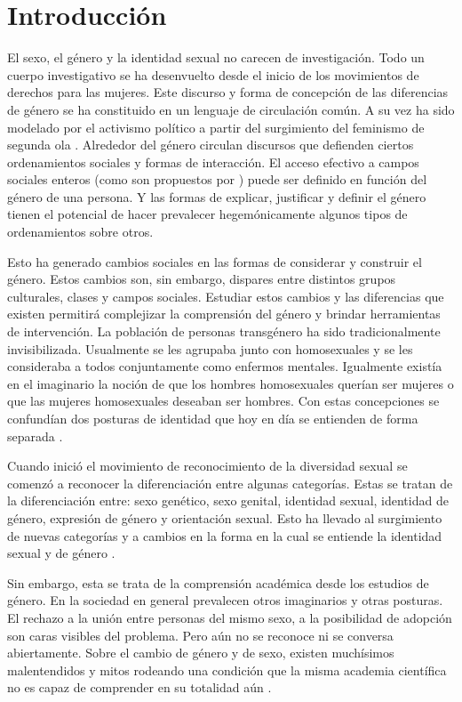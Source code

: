 \chapter{Introducción}
El sexo, el género y la identidad sexual no carecen de investigación.
Todo un cuerpo investigativo se ha desenvuelto desde el inicio de los
movimientos de derechos para las mujeres.
Este discurso y forma de concepción de las diferencias de género se ha
constituido en un lenguaje de circulación común.
A su vez ha sido modelado por el activismo político a partir del surgimiento del
feminismo de segunda ola \parencite{Helfrich2001}.
Alrededor del género circulan discursos que defienden ciertos ordenamientos
sociales y formas de interacción.
El acceso efectivo a campos sociales enteros (como son propuestos por
\textcite{Bourdieu1992}) puede ser definido en función del género de una
persona.
Y las formas de explicar, justificar y definir el género tienen el potencial de
hacer prevalecer hegemónicamente algunos tipos de ordenamientos sobre otros.

Esto ha generado cambios sociales en las formas de considerar y construir el
género.
Estos cambios son, sin embargo, dispares entre distintos grupos culturales,
clases y campos sociales.
Estudiar estos cambios y las diferencias que existen permitirá complejizar la
comprensión del género y brindar herramientas de intervención.
La población de personas transgénero ha sido tradicionalmente invisibilizada.
Usualmente se les agrupaba junto con homosexuales y se les consideraba a todos
conjuntamente como enfermos mentales.
Igualmente existía en el imaginario la noción de que los hombres homosexuales
querían ser mujeres o que las mujeres homosexuales deseaban ser hombres.
Con estas concepciones se confundían dos posturas de identidad que hoy en día se
entienden de forma separada \parencite{MejiaTurizo2010-06}.

Cuando inició el movimiento de reconocimiento de la diversidad sexual se comenzó
a reconocer la diferenciación entre algunas categorías.
Estas se tratan de la diferenciación entre: sexo genético, sexo genital,
identidad sexual, identidad de género, expresión de género y orientación sexual.
Esto ha llevado al surgimiento de nuevas categorías y a cambios en la forma en
la cual se entiende la identidad sexual y de género
\parencite{Figari2010,Bleichmar2006}.

Sin embargo, esta se trata de la comprensión académica desde los estudios de
género.
En la sociedad en general prevalecen otros imaginarios y otras posturas.
El rechazo a la unión entre personas del mismo sexo, a la posibilidad de
adopción son caras visibles del problema.
Pero aún no se reconoce ni se conversa abiertamente.
Sobre el cambio de género y de sexo, existen muchísimos malentendidos y mitos
rodeando una condición que la misma academia científica no es capaz de
comprender en su totalidad aún \parencite{Bleichmar2006}.

